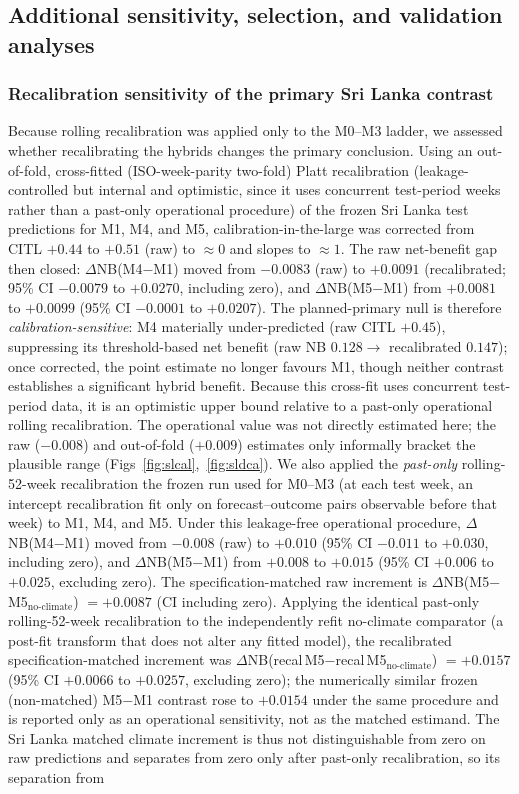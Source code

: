 \documentclass[11pt,a4paper]{article}
\begin{document}
\subsection{Additional sensitivity, selection, and validation analyses}

\subsubsection*{Recalibration sensitivity of the primary Sri Lanka contrast}
Because rolling recalibration was applied only to the M0--M3 ladder, we assessed whether recalibrating the hybrids changes the primary conclusion. Using an out-of-fold, cross-fitted (ISO-week-parity two-fold) Platt recalibration (leakage-controlled but internal and optimistic, since it uses concurrent test-period weeks rather than a past-only operational procedure) of the frozen Sri Lanka test predictions for M1, M4, and M5, calibration-in-the-large was corrected from CITL $+0.44$ to $+0.51$ (raw) to $\approx0$ and slopes to $\approx1$. The raw net-benefit gap then closed: $\Delta$NB(M4$-$M1) moved from $-0.0083$ (raw) to $+0.0091$ (recalibrated; 95\% CI $-0.0079$ to $+0.0270$, including zero), and $\Delta$NB(M5$-$M1) from $+0.0081$ to $+0.0099$ (95\% CI $-0.0001$ to $+0.0207$). The planned-primary null is therefore \emph{calibration-sensitive}: M4 materially under-predicted (raw CITL $+0.45$), suppressing its threshold-based net benefit (raw NB $0.128\to$ recalibrated $0.147$); once corrected, the point estimate no longer favours M1, though neither contrast establishes a significant hybrid benefit. Because this cross-fit uses concurrent test-period data, it is an optimistic upper bound relative to a past-only operational rolling recalibration. The operational value was not directly estimated here; the raw ($-0.008$) and out-of-fold ($+0.009$) estimates only informally bracket the plausible range (Figs~\ref{fig:slcal},~\ref{fig:sldca}). We also applied the \emph{past-only} rolling-52-week recalibration the frozen run used for M0--M3 (at each test week, an intercept recalibration fit only on forecast--outcome pairs observable before that week) to M1, M4, and M5. Under this leakage-free operational procedure, $\Delta$NB(M4$-$M1) moved from $-0.008$ (raw) to $+0.010$ (95\% CI $-0.011$ to $+0.030$, including zero), and $\Delta$NB(M5$-$M1) from $+0.008$ to $+0.015$ (95\% CI $+0.006$ to $+0.025$, excluding zero). The specification-matched raw increment is $\Delta$NB(M5$-$M5$_{\text{no-climate}}$) $=+0.0087$ (CI including zero). Applying the identical past-only rolling-52-week recalibration to the independently refit no-climate comparator (a post-fit transform that does not alter any fitted model), the recalibrated specification-matched increment was $\Delta$NB(recal\,M5$-$recal\,M5$_{\text{no-climate}}$) $=+0.0157$ (95\% CI $+0.0066$ to $+0.0257$, excluding zero); the numerically similar frozen (non-matched) M5$-$M1 contrast rose to $+0.0154$ under the same procedure and is reported only as an operational sensitivity, not as the matched estimand. The Sri Lanka matched climate increment is thus not distinguishable from zero on raw predictions and separates from zero only after past-only recalibration, so its separation from 
\end{document}
